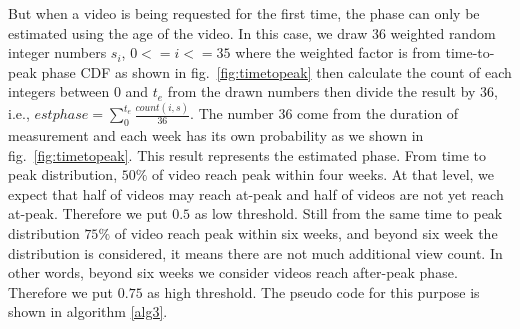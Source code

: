 \documentclass[10pt,final,journal,a4paper]{IEEEtran}
\begin{document}
But when a video is being requested for the first time, the phase can only be estimated using the age of the video.
In this case, we draw 36 weighted random integer numbers $s_i$, $0 <= i <= 35$ where the weighted factor is from time-to-peak phase CDF as shown in fig.~\ref{fig:timetopeak} then calculate the count of each integers between $0$ and $t_e$ from the drawn numbers then divide the result by 36, 
i.e., $estphase = \sum_{0}^{t_e} \frac{count(i,s)}{36}$.
The number 36 come from the duration of measurement and each week has its own probability as we shown in fig.~\ref{fig:timetopeak}.
This result represents the estimated phase. 
From time to peak distribution, $50\%$ of video reach peak within four weeks. 
At that level, we expect that half of videos may reach at-peak and half of videos are not yet reach at-peak.
Therefore we put $0.5$ as low threshold.  
Still from the same time to peak distribution $75\%$ of video reach peak within six weeks, and beyond six week the distribution is considered, it means there are not much additional view count. 
In other words, beyond six weeks we consider videos reach after-peak phase. 
Therefore we put $0.75$ as high threshold.
The pseudo code for this purpose is shown in algorithm \ref{alg3}.



\end{document}
